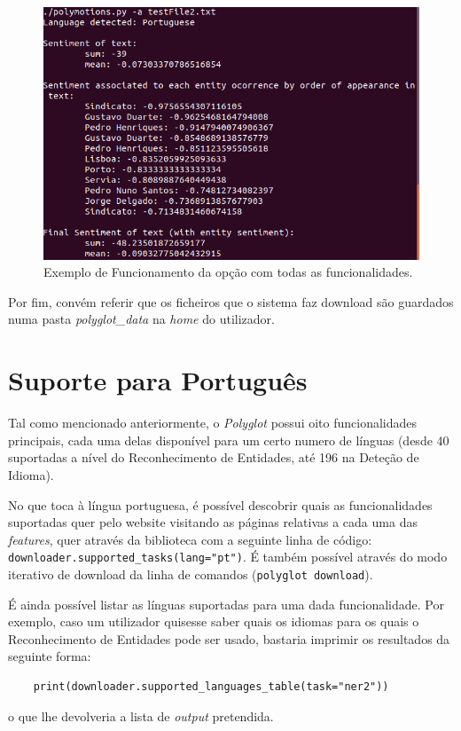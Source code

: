\documentclass{article}
\begin{document}
\begin{figure}[H]
\begin{center}
    \includegraphics[width = 12cm, keepaspectratio]{Pictures/a.png}
    \caption{Exemplo de Funcionamento da opção com todas as funcionalidades. }
    \label{fig:aoption}
\end{center}
\end{figure}

Por fim, convém referir que os ficheiros que o sistema faz download são guardados numa pasta \textit{polyglot\_data} na \textit{home} do utilizador.

\section{Suporte para Português}

\quad Tal como mencionado anteriormente, o \textit{Polyglot} possui oito funcionalidades principais, cada uma delas disponível para um certo numero de línguas (desde 40 suportadas a nível do Reconhecimento de Entidades, até 196 na Deteção de Idioma).

No que toca à língua portuguesa, é possível descobrir quais as funcionalidades suportadas quer pelo website visitando as páginas relativas a cada uma das \textit{features}, quer através da biblioteca com a seguinte linha de código: \verb|downloader.supported_tasks(lang="pt")|. É também possível através do modo iterativo de download da linha de comandos (\verb|polyglot download|). 

É ainda possível listar as línguas suportadas para uma dada funcionalidade. Por exemplo, caso um utilizador quisesse saber quais os idiomas para os quais o Reconhecimento de Entidades pode ser usado, bastaria imprimir os resultados da seguinte forma:
\begin{verbatim}
    print(downloader.supported_languages_table(task="ner2"))    
\end{verbatim}
o que lhe devolveria a lista de \textit{output} pretendida.
\end{document}
